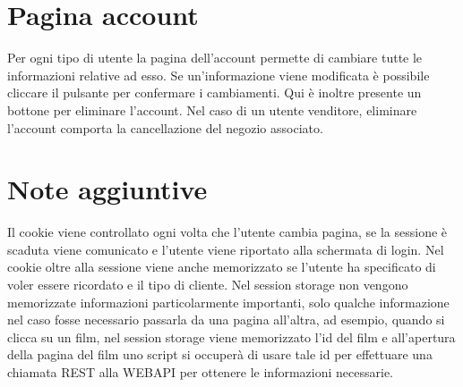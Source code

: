 \documentclass{article}
\begin{document}
\section{Pagina account}
    Per ogni tipo di utente la pagina dell'account permette di cambiare tutte le informazioni relative ad esso.
    Se un'informazione viene modificata è possibile cliccare il pulsante per confermare i cambiamenti.
    Qui è inoltre presente un bottone per eliminare l'account.
    Nel caso di un utente venditore, eliminare l'account comporta la cancellazione del negozio associato.

\section{Note aggiuntive}
Il cookie viene controllato ogni volta che l'utente cambia pagina, se la sessione è scaduta viene comunicato e l'utente viene riportato alla
schermata di login.
Nel cookie oltre alla sessione viene anche memorizzato se l'utente ha specificato di voler essere ricordato e il tipo di cliente.
Nel session storage non vengono memorizzate informazioni particolarmente importanti, solo qualche informazione nel caso fosse necessario passarla da una pagina all'altra,
ad esempio, quando si clicca su un film, nel session storage viene memorizzato l'id del film e all'apertura della pagina del film uno script si occuperà di usare tale id per 
effettuare una chiamata REST alla WEBAPI per ottenere le informazioni necessarie.
\end{document}
